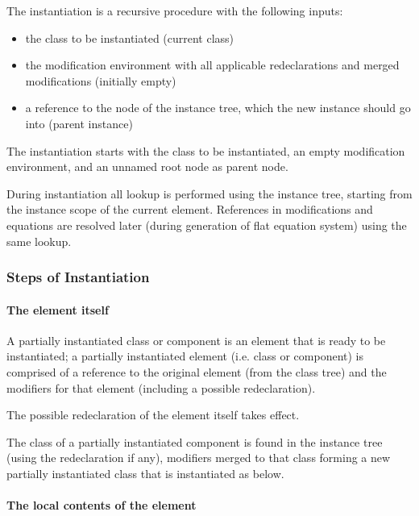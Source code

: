 The instantiation is a recursive procedure with the following inputs:
\begin{itemize}
\item
  the class to be instantiated (current class)
\item
  the modification environment with all applicable redeclarations and
  merged modifications (initially empty)
\item
  a reference to the node of the instance tree, which the new instance
  should go into (parent instance)
\end{itemize}

The instantiation starts with the class to be instantiated, an empty
modification environment, and an unnamed root node as parent node.

During instantiation all lookup is performed using the instance tree,
starting from the instance scope of the current element. References in
modifications and equations are resolved later (during generation of
flat equation system) using the same lookup.

\subsubsection{Steps of Instantiation}

\paragraph*{The element itself}

A partially instantiated class or component is an element that is ready
to be instantiated; a partially instantiated element (i.e. class or
component) is comprised of a reference to the original element (from the
class tree) and the modifiers for that element (including a possible
redeclaration).

The possible redeclaration of the element itself takes effect.

The class of a partially instantiated component is found in the instance
tree (using the redeclaration if any), modifiers merged to that class
forming a new partially instantiated class that is instantiated as
below.

\paragraph*{The local contents of the element}


